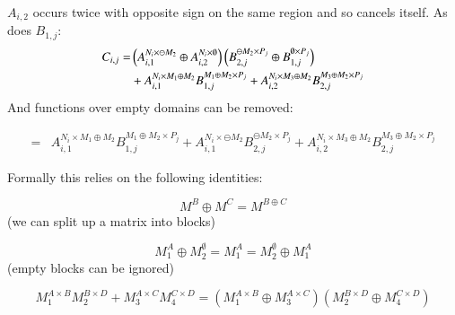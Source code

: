$A_{i,2}$ occurs twice with opposite sign on the same region and so cancels itself. As does $B_{1,j}$:
\begin{align}
	C_{i,j} 	=& \left( A_{i,1}^{N_i \times \ominus M_2} \oplus  A_{i,2}^{N_i \times \emptyset}  \right)
			\left(  B_{2,j}^{\ominus M_2 \times P_j} \oplus B_{1,j}^{\emptyset \times P_j} \right)\notag\\
			&+ A_{i,1}^{N_i \times M_1 \oplus M_2} B_{1,j}^{M_1 \oplus M_2 \times P_j} 
			+ A_{i,2}^{N_i \times M_3 \oplus M_2} B_{2,j}^{M_3 \oplus M_2 \times P_j} 
\end{align}
And functions over empty domains can be removed:

\begin{align}
			= & A_{i,1}^{N_i \times M_1 \oplus M_2} B_{1,j}^{M_1 \oplus M_2 \times P_j} 
			+ A_{i,1}^{N_i \times \ominus M_2} B_{2,j}^{\ominus M_2 \times P_j}
			+ A_{i,2}^{N_i \times M_3 \oplus M_2} B_{2,j}^{M_3 \oplus M_2 \times P_j}
\end{align}


Formally this relies on the following identities:

\begin{equation}
	M^B \oplus M^C = M^{B\oplus C}
\end{equation}
(we can split up a matrix into blocks)

\begin{equation}
	M_1^A \oplus M_2^\emptyset = M_1^A = M_2^\emptyset \oplus M_1^A
\end{equation}
(empty blocks can be ignored)

\begin{equation}
	M_1^{A \times B} M_2^{B \times D} + M_3^{A \times C} M_4^{C \times D} 
	= \left(M_1^{A\times B} \oplus M_3^{A \times C} \right) \left( M_2^{B \times D} \oplus M_4^{C \times D} \right)
\end{equation}





















